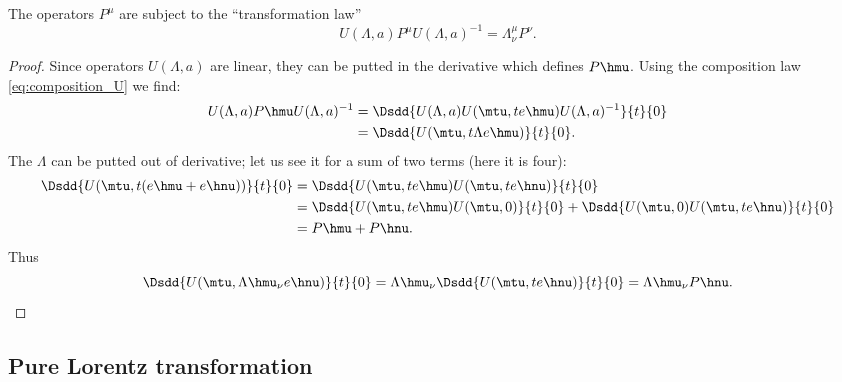 \begin{proposition}
The operators $P^{\mu}$ are subject to the ``transformation law''
\begin{equation}
   U(\Lambda,a)P^{\mu} U(\Lambda,a)^{-1}=\Lambda^{\mu}_{\nu} P^{\nu}.
\end{equation}
\end{proposition}

\begin{proof}
Since operators $U(\Lambda,a)$ are linear, they can be putted in the derivative which defines $P\hmu$. Using the composition law  \eqref{eq:composition_U} we find:
\begin{equation}
\begin{split}
   U(\Lambda,a)P\hmu U(\Lambda,a)^{-1}&=\Dsdd{ U(\Lambda,a)U(\mtu,te\hmu)U(\Lambda,a)^{-1} }{t}{0}\\
                                     &=\Dsdd{U(\mtu,t\Lambda e\hmu)}{t}{0}.
\end{split}				     
\end{equation}
The $\Lambda$ can be putted out of derivative; let us see it for a sum of two terms (here it is four):
\begin{equation}
\begin{split}
  \Dsdd{ U(\mtu,t(e\hmu+e\hnu)) }{t}{0}&=\Dsdd{U(\mtu,te\hmu)U(\mtu,te\hnu)}{t}{0}\\
                                      &=\Dsdd{U(\mtu,te\hmu)U(\mtu,0)}{t}{0}
				        +\Dsdd{U(\mtu,0)U(\mtu,te\hnu)}{t}{0}\\
				      &=P\hmu+P\hnu.
\end{split}
\end{equation}
Thus 
\begin{equation}
    \Dsdd{U(\mtu,\Lambda\hmu_{\nu} e\hnu)}{t}{0}=\Lambda\hmu_{\nu}\Dsdd{U(\mtu,te\hnu)}{t}{0}
                                              =\Lambda\hmu_{\nu} P\hnu.
\end{equation}
\end{proof}

\subsection{Pure Lorentz transformation}

